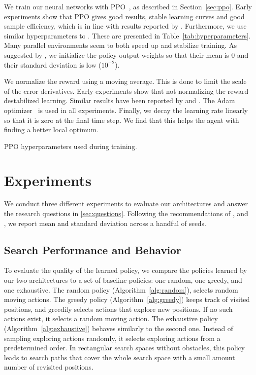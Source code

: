 We train our neural networks with PPO~\cite{schulman_proximal_2017}, as described in Section~\ref{sec:ppo}.
Early experiments show that PPO gives good results, stable learning curves and good sample efficiency, which is in line with results reported by \cite{andrychowicz_what_2020}.
Furthermore, we use similar hyperparameters to \cite{cobbe_leveraging_2020}.
These are presented in Table~\ref{tab:hyperparameters}.
Many parallel environments seem to both speed up and stabilize training. 
As suggested by \cite{andrychowicz_what_2020}, we initialize the policy output weights so that their mean is 0 and their standard deviation is low (\(10^{-2}\)).

We normalize the reward using a moving average.
This is done to limit the scale of the error derivatives.
Early experiments show that not normalizing the reward destabilized learning. %
Similar results have been reported by \cite{andrychowicz_what_2020} and \cite{mnih_playing_2013}.
The Adam optimizer~\cite{kingma_adam_2017} is used in all experiments.
Finally, we decay the learning rate linearly so that it is zero at the final time step.
We find that this helps the agent with finding a better local optimum.

\begin{table}
    \centering
    \caption[PPO hyperparameters]{PPO hyperparameters used during training.}
    
    \label{tab:hyperparameters}
\end{table}

\section{Experiments}
\label{sec:experiments}

We conduct three different experiments to evaluate our architectures and answer the research questions in \ref{sec:questions}. 
Following the recommendations of \cite{henderson_deep_2018}, \cite{colas_hitchhikers_2019} and \cite{agarwal_deep_2022}, we report mean and standard deviation across a handful of seeds.

\subsection{Search Performance and Behavior}

To evaluate the quality of the learned policy, we compare the policies learned by our two architectures to a set of baseline policies: 
one random, one greedy, and one exhaustive.
The random policy (Algorithm~\ref{alg:random}), selects random moving actions.
The greedy policy (Algorithm~\ref{alg:greedy}) keeps track of visited positions, and greedily selects actions that explore new positions.
If no such actions exist, it selects a random moving action.
The exhaustive policy (Algorithm~\ref{alg:exhaustive}) behaves similarly to the second one.
Instead of sampling exploring actions randomly, it selects exploring actions from a predetermined order.
In rectangular search spaces without obstacles, this policy leads to search paths that cover the whole search space with a small amount number of revisited positions.


